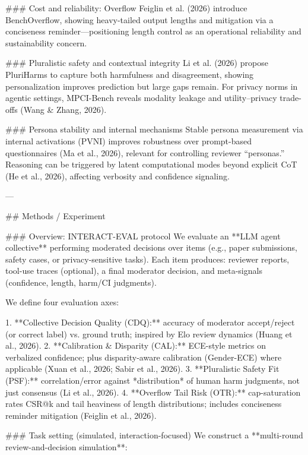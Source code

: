 ### Cost and reliability: Overflow  
Feiglin et al. (2026) introduce BenchOverflow, showing heavy-tailed output lengths and mitigation via a conciseness reminder—positioning length control as an operational reliability and sustainability concern.

### Pluralistic safety and contextual integrity  
Li et al. (2026) propose PluriHarms to capture both harmfulness and disagreement, showing personalization improves prediction but large gaps remain. For privacy norms in agentic settings, MPCI-Bench reveals modality leakage and utility–privacy trade-offs (Wang & Zhang, 2026).

### Persona stability and internal mechanisms  
Stable persona measurement via internal activations (PVNI) improves robustness over prompt-based questionnaires (Ma et al., 2026), relevant for controlling reviewer “personas.” Reasoning can be triggered by latent computational modes beyond explicit CoT (He et al., 2026), affecting verbosity and confidence signaling.

---

## Methods / Experiment  

### Overview: INTERACT-EVAL protocol  
We evaluate an **LLM agent collective** performing moderated decisions over items (e.g., paper submissions, safety cases, or privacy-sensitive tasks). Each item produces: reviewer reports, tool-use traces (optional), a final moderator decision, and meta-signals (confidence, length, harm/CI judgments).

We define four evaluation axes:

1. **Collective Decision Quality (CDQ):** accuracy of moderator accept/reject (or correct label) vs. ground truth; inspired by Elo review dynamics (Huang et al., 2026).  
2. **Calibration & Disparity (CAL):** ECE-style metrics on verbalized confidence; plus disparity-aware calibration (Gender-ECE) where applicable (Xuan et al., 2026; Sabir et al., 2026).  
3. **Pluralistic Safety Fit (PSF):** correlation/error against *distribution* of human harm judgments, not just consensus (Li et al., 2026).  
4. **Overflow Tail Risk (OTR):** cap-saturation rates CSR@k and tail heaviness of length distributions; includes conciseness reminder mitigation (Feiglin et al., 2026).

### Task setting (simulated, interaction-focused)  
We construct a **multi-round review-and-decision simulation**:

